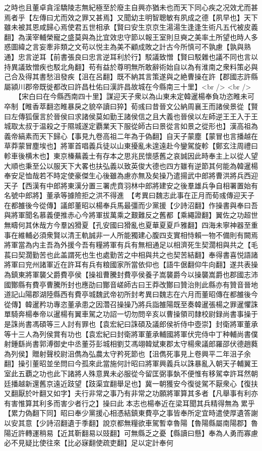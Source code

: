 之時也且董卓貪淫驕陵志無紀極至於廢主自興亦猶未也而天下同心疾之况效尤而甚焉者乎【左傳曰尤而效之罪又甚焉】又聞幼主明智聰敏有夙成之德【夙早也】天下雖未被其恩咸歸心焉使君五世相承【賢曰安生京京生湯湯生逢逢生術凡五代被皮義翻】為漢宰輔榮寵之盛莫與為比宜效忠守節以報王室則旦奭之美率土所望也時人多惑圖緯之言妄牽非類之文苟以悦主為美不顧成敗之計古今所慎可不孰慮【孰與熟通】忠言逆耳【前書張良曰忠言逆耳利於行】駁議致憎【賢曰駁雜也議不同也言以持異議致憎疾也駁北角翻】苟有益於尊明無所敢辭術始自以為有淮南之衆料策必與己合及得其書愁沮發疾【沮在呂翻】既不納其言策遂與之絶曹操在許【郡國志許縣屬潁川郡帝既徙都改曰許昌杜佑曰漢許昌故城在今縣南三十里】<br />
<br />
　　【宋白曰在今縣西南四十里】謀迎天子衆以為山東未定韓暹楊奉負功恣睢未可卒制【睢香萃翻恣睢暴戾之貌卒讀曰猝】荀彧曰昔晉文公納周襄王而諸侯景從【賢曰左傳狐偃言於晉侯曰求諸侯莫如勤王諸侯信之且大義也晉侯以左師逆王王入于王城取太叔于温殺之于隰城遂定覇業天下服從師古曰景從言如景之從形也】漢高祖為義帝縞素而天下歸心【事見九卷高祖二年為于偽翻】自天子蒙塵【蒙冒也言播越在草莽蒙冒塵埃也】將軍首唱義兵徒以山東擾亂未遑遠赴今鑾駕旋軫【鄭玄注周禮曰軫車後横木也】東京榛蕪義士有存本之思兆民懷感舊之哀誠因此時奉主上以從人望大順也秉至公以服天下大畧也扶弘義以致英俊大德也四方雖有逆節其何能為韓暹楊奉安足恤哉若不時定使豪傑生心後雖為慮亦無及矣操乃遣揚武中郎將曹洪將兵西迎天子【西漢有中郎將東漢分置三署虎賁羽林中郎將建安之後羣雄兵争自相署置始有名號中郎將】董承等據險拒之洪不得進　【考異曰魏志此事在正月而荀彧傳迎天子在都雒後今從傳】議郎董昭以楊奉兵馬最彊而少黨援【少詩沼翻】作操書與奉曰吾與將軍聞名慕義便推赤心今將軍拔萬乘之艱難反之舊都【乘繩證翻】翼佐之功超世無疇何其休哉方今羣凶猾夏【孔安國曰猾亂也夏華夏夏戶雅翻】四海未寧神器至重事在維輔必須衆賢以清王軌誠非一人所能獨建心腹四支實相恃賴一物不備則有闕焉將軍當為内主吾為外援今吾有糧將軍有兵有無相通足以相濟死生契濶相與共之【毛萇曰契濶勤苦也此盖謂死也生也處勤苦之中相與共之也契苦結翻】奉得書喜悦語諸將軍曰兖州諸軍近在許耳有兵有粮國家所當依仰也【語牛倨翻仰牛向翻】遂共表操為鎮東將軍襲父爵費亭侯【操祖曹騰封費亭侯養子嵩襲爵今以操襲嵩爵也郡國志沛國酇縣有費亭曹騰所封也應劭曰酇音嵯師古曰王莽改酇曰贊治則此縣亦有贊音晉地道記山陽郡湖陸縣西有費亭城魏武帝初所封考異曰魏志在六月而董昭傳在都雒後今從傳】韓暹矜功專恣董承患之因濳召操操乃將兵詣雒陽既至奏韓暹張楊之罪暹懼誅單騎奔楊奉帝以暹楊有翼車駕之功詔一切勿問辛亥以曹操領司隸校尉録尚書事操于是誅尚書馮碩等三人討有罪也【袁宏紀曰誅碩及議郎侯祈侍中壺崇】封衛將軍董承等十三人為列侯賞有功也【袁宏紀曰封衛將軍董承輔國將軍伏完侍中丁种輔尚書僕射鍾繇尚書郭溥御史中丞董芬彭城相劉艾馮翊韓斌東郡太守楊衆議郎羅邵伏德趙蕤為列侯】贈射聲校尉沮儁為弘農太守矜死節也【沮儁死事見上卷興平二年沮子余翻】操引董昭並坐問曰今孤來此當施何計昭曰將軍興義兵以誅暴亂入朝天子輔翼王室此五覇之功也此下諸將人殊意異未必服從今留匡弼事埶不便惟有移駕幸許耳然朝廷播越新還舊京遠近跂望【跂渠宜翻舉足也】冀一朝獲安今復徙駕不厭衆心【復扶又翻厭於叶翻又如字】夫行非常之事乃有非常之功願將軍算其多者【凡舉事有利亦有害惟算其利多而害少者行之】操曰此本志也楊奉近在梁耳聞其兵精得無為累乎【累力偽翻下同】昭曰奉少黨援心相憑結鎮東費亭之事皆奉所定宜時遣使厚遺答謝以安其意【少詩沼翻遺于季翻】說京都無糧欲車駕暫幸魯陽【魯陽縣屬南陽郡】魯陽近許轉運稍易【近其靳翻易以豉翻】可無縣乏之憂【縣讀曰懸】奉為人勇而寡慮必不見疑比使往來【比必寐翻使疏吏翻】足以定計奉何